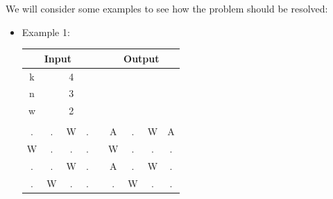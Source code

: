 \documentclass[12pt]{article}
\begin{document}
We will consider some examples to see how the problem should be resolved:\\
\begin{itemize}
    \item Example 1: 
\begin{tabular}{|cccc|c|cccc|}
\hline
\multicolumn{4}{|c|}{Input}                                                   &  & \multicolumn{4}{c|}{Output}                                                  \\ \hline
\multicolumn{1}{|c|}{k} & \multicolumn{1}{c|}{}  & \multicolumn{1}{c|}{4} &   &  & \multicolumn{1}{c|}{}  & \multicolumn{1}{c|}{}  & \multicolumn{1}{c|}{}  &   \\ \hline
\multicolumn{1}{|c|}{n} & \multicolumn{1}{c|}{}  & \multicolumn{1}{c|}{3} &   &  & \multicolumn{1}{c|}{}  & \multicolumn{1}{c|}{}  & \multicolumn{1}{c|}{}  &   \\ \hline
\multicolumn{1}{|c|}{w} & \multicolumn{1}{c|}{}  & \multicolumn{1}{c|}{2} &   &  & \multicolumn{1}{c|}{}  & \multicolumn{1}{c|}{}  & \multicolumn{1}{c|}{}  &   \\ \hline
\multicolumn{1}{|c|}{}  & \multicolumn{1}{c|}{}  & \multicolumn{1}{c|}{}  &   &  & \multicolumn{1}{c|}{}  & \multicolumn{1}{c|}{}  & \multicolumn{1}{c|}{}  &   \\ \hline
\multicolumn{1}{|c|}{.} & \multicolumn{1}{c|}{.} & \multicolumn{1}{c|}{W} & . &  & \multicolumn{1}{c|}{A} & \multicolumn{1}{c|}{.} & \multicolumn{1}{c|}{W} & A \\ \hline
\multicolumn{1}{|c|}{W} & \multicolumn{1}{c|}{.} & \multicolumn{1}{c|}{.} & . &  & \multicolumn{1}{c|}{W} & \multicolumn{1}{c|}{.} & \multicolumn{1}{c|}{.} & . \\ \hline
\multicolumn{1}{|c|}{.} & \multicolumn{1}{c|}{.} & \multicolumn{1}{c|}{W} & . &  & \multicolumn{1}{c|}{A} & \multicolumn{1}{c|}{.} & \multicolumn{1}{c|}{W} & . \\ \hline
\multicolumn{1}{|c|}{.} & \multicolumn{1}{c|}{W} & \multicolumn{1}{c|}{.} & . &  & \multicolumn{1}{c|}{.} & \multicolumn{1}{c|}{W} & \multicolumn{1}{c|}{.} & . \\ \hline
\end{tabular}


\end{itemize}
\end{document}
